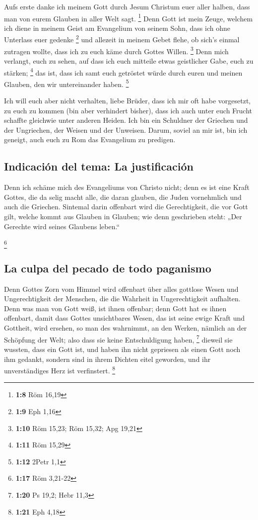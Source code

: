  Aufs erste danke ich meinem Gott durch Jesum Christum
euer aller halben, dass man von eurem Glauben in aller Welt sagt.
\footnote{\textbf{1:8} Röm 16,19}  Denn Gott ist mein
Zeuge, welchem ich diene in meinem Geist am Evangelium von seinem Sohn,
dass ich ohne Unterlass euer gedenke \footnote{\textbf{1:9} Eph 1,16}
 und allezeit in meinem Gebet flehe, ob sich's einmal
zutragen wollte, dass ich zu euch käme durch Gottes Willen. \footnote{\textbf{1:10}
  Röm 15,23; Röm 15,32; Apg 19,21}  Denn mich verlangt,
euch zu sehen, auf dass ich euch mitteile etwas geistlicher Gabe, euch
zu stärken; \footnote{\textbf{1:11} Röm 15,29}  das ist,
dass ich samt euch getröstet würde durch euren und meinen Glauben, den
wir untereinander haben. \footnote{\textbf{1:12} 2Petr 1,1}

 Ich will euch aber nicht verhalten, liebe Brüder, dass
ich mir oft habe vorgesetzt, zu euch zu kommen (bin aber verhindert
bisher), dass ich auch unter euch Frucht schaffte gleichwie unter
anderen Heiden.  Ich bin ein Schuldner der Griechen und
der Ungriechen, der Weisen und der Unweisen.  Darum,
soviel an mir ist, bin ich geneigt, auch euch zu Rom das Evangelium zu
predigen.

\hypertarget{indicaciuxf3n-del-tema-la-justificaciuxf3n}{%
\subsection{Indicación del tema: La
justificación}\label{indicaciuxf3n-del-tema-la-justificaciuxf3n}}

 Denn ich schäme mich des Evangeliums von Christo nicht;
denn es ist eine Kraft Gottes, die da selig macht alle, die daran
glauben, die Juden vornehmlich und auch die Griechen. 
Sintemal darin offenbart wird die Gerechtigkeit, die vor Gott gilt,
welche kommt aus Glauben in Glauben; wie denn geschrieben steht: „Der
Gerechte wird seines Glaubens leben.``

\footnote{\textbf{1:17} Röm 3,21-22}

\hypertarget{la-culpa-del-pecado-de-todo-paganismo}{%
\subsection{La culpa del pecado de todo
paganismo}\label{la-culpa-del-pecado-de-todo-paganismo}}

 Denn Gottes Zorn vom Himmel wird offenbart über alles
gottlose Wesen und Ungerechtigkeit der Menschen, die die Wahrheit in
Ungerechtigkeit aufhalten.  Denn was man von Gott weiß,
ist ihnen offenbar; denn Gott hat es ihnen offenbart, 
damit dass Gottes unsichtbares Wesen, das ist seine ewige Kraft und
Gottheit, wird ersehen, so man des wahrnimmt, an den Werken, nämlich an
der Schöpfung der Welt; also dass sie keine Entschuldigung haben,
\footnote{\textbf{1:20} Ps 19,2; Hebr 11,3}  dieweil sie
wussten, dass ein Gott ist, und haben ihn nicht gepriesen als einen Gott
noch ihm gedankt, sondern sind in ihrem Dichten eitel geworden, und ihr
unverständiges Herz ist verfinstert. \footnote{\textbf{1:21} Eph 4,18}

